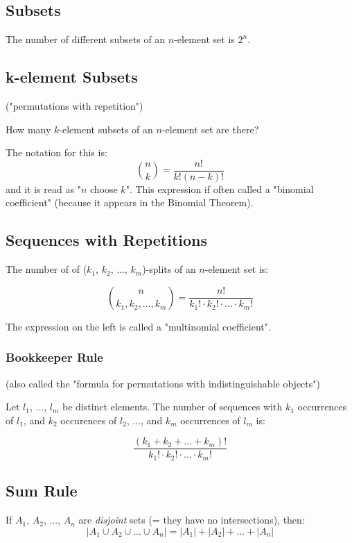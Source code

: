 \documentclass[../main.tex]{subfiles}
\begin{document}
\subsection{Subsets}

The number of different subsets of an $n$-element set is $2^n$.

\subsection{k-element Subsets}

("permutations with repetition")

How many $k$-element subsets of an $n$-element set are there?

The notation for this is:
$$
\binom{n}{k} = \frac{n!}{k!(n-k)!}
$$
and it is read as "$n$ choose $k$". This expression if often called a "binomial coefficient" (because it appears in the Binomial Theorem).

\subsection{Sequences with Repetitions}

The number of of ($k_1$, $k_2$, ..., $k_m$)-splits of an $n$-element set is:

$$
\binom{n}{k_1, k_2, ..., k_m} = \frac{n!}{k_1! \cdot k_2! \cdot ... \cdot k_m!}
$$

The expression on the left is called a "multinomial coefficient".

\subsubsection{Bookkeeper Rule}

(also called the "formula for permutations with indistinguishable objects")

Let $l_1$, ..., $l_m$ be distinct elements. The number of sequences with $k_1$ occurrences of $l_1$, and $k_2$ occurences of $l_2$, ..., and $k_m$ occurrences of $l_m$ is:

$$
\frac{(k_1 + k_2 + ... + k_m)!}{k_1! \cdot k_2! \cdot ... \cdot k_m!}
$$

\subsection{Sum Rule}

If $A_1$, $A_2$, ..., $A_n$ are \textit{disjoint} sets (= they have no intersections), then: 
$$
\lvert A_1 \cup A_2 \cup ... \cup A_n \rvert = \lvert A_1 \rvert + \lvert A_2 \rvert + ... + \lvert A_n \rvert
$$
\end{document}
